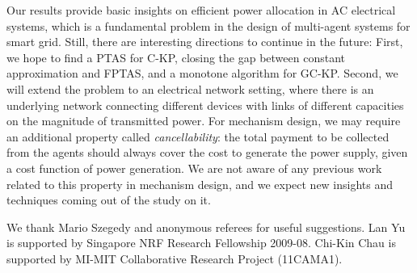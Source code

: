\documentclass{aamas2013}
\begin{document}
Our results provide basic insights on efficient power allocation in AC electrical systems, which is a fundamental problem in the design of multi-agent systems for smart grid.
Still, there are interesting directions to continue in the future: First, we hope to find a PTAS for C-KP, closing the gap between constant approximation and FPTAS, and a monotone algorithm for GC-KP.  Second, we will extend the problem to an electrical network setting, where there is an underlying network connecting different devices with links of different capacities on the magnitude of transmitted power.  For mechanism design, we may require an additional property called {\em cancellability}: the total payment to be collected from the agents should always cover the cost to generate the power supply, given a cost function of power generation.  We are not aware of any previous work related to this property in mechanism design, and we expect new insights and techniques coming out of the study on it.       

\medskip
{} 
We thank Mario Szegedy and anonymous referees for useful suggestions.  Lan Yu is supported by Singapore NRF Research Fellowship 2009-08.  Chi-Kin Chau is supported by MI-MIT Collaborative Research Project (11CAMA1).


\end{document}
